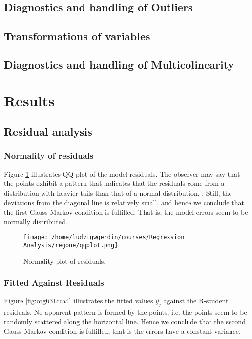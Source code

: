 \documentclass[11pt]{article}
\begin{document}
\subsection{Diagnostics and handling of Outliers}
\label{sec:orgadb80e9}
\subsection{Transformations of variables}
\label{sec:org021163f}
\subsection{Diagnostics and handling of Multicolinearity}
\label{sec:orgfc713a0}
\section{Results}
\label{sec:org90085ba}
\subsection{Residual analysis}
\label{sec:org0c75d0a}
\subsubsection{Normality of residuals}
\label{sec:org05acc04}

Figure \ref{fig:org2c6d76c} illustrates QQ plot of the model residuals. The observer may say that the 
points exhibit a pattern that indicates that the residuals come from a distribution with heavier tails
than that of a normal distribution. 
\cite{Montgomery2012}. Still, the deviations from the diagonal line is relatively small, and hence
we conclude that the first Gauss-Markov condition is fulfilled. That is, the model errors seem to be 
normally distributed.

\begin{figure}[htbp]
\centering
\texttt{[image: /home/ludvigwgerdin/courses/Regression Analysis/regone/qqplot.png]}
\caption{\label{fig:org2c6d76c}
Normality plot of residuals.}
\end{figure}

\subsubsection{Fitted Against Residuals}
\label{sec:org75f783b}

Figure \ref{fig:org631cca4} illustrates the fitted values \(\hat y_j\) against the R-student residuals. No apparent 
pattern is formed by the points, i.e. the points seem to be randomly scattered along the horizontal line.
Hence we conclude that the second Gauss-Markov condition is fulfilled, that is the errors have a constant 
variance.
\end{document}
